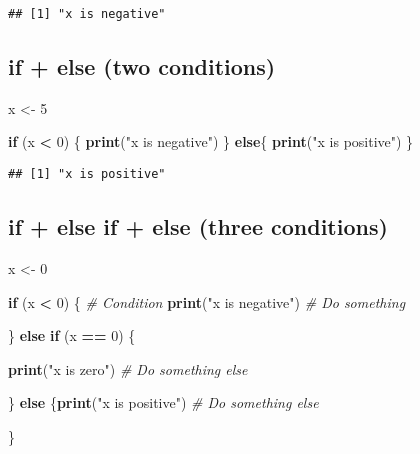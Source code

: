 \documentclass[
]{book}
\newenvironment{Shaded}{\begin{snugshade}}{\end{snugshade}}
\newcommand{\CommentTok}[1]{\textcolor[rgb]{0.56,0.35,0.01}{\textit{#1}}}
\newcommand{\ControlFlowTok}[1]{\textcolor[rgb]{0.13,0.29,0.53}{\textbf{#1}}}
\newcommand{\DecValTok}[1]{\textcolor[rgb]{0.00,0.00,0.81}{#1}}
\newcommand{\KeywordTok}[1]{\textcolor[rgb]{0.13,0.29,0.53}{\textbf{#1}}}
\newcommand{\NormalTok}[1]{#1}
\newcommand{\OperatorTok}[1]{\textcolor[rgb]{0.81,0.36,0.00}{\textbf{#1}}}
\newcommand{\StringTok}[1]{\textcolor[rgb]{0.31,0.60,0.02}{#1}}
\begin{document}
\begin{verbatim}
## [1] "x is negative"
\end{verbatim}

\hypertarget{if-else-two-conditions}{%
\subsection{if + else (two conditions)}\label{if-else-two-conditions}}

\begin{Shaded}
\begin{Highlighting}[]
\NormalTok{x \textless{}{-}}\StringTok{ }\DecValTok{5}

\ControlFlowTok{if}\NormalTok{ (x }\OperatorTok{\textless{}}\StringTok{ }\DecValTok{0}\NormalTok{) \{}
  \KeywordTok{print}\NormalTok{(}\StringTok{"x is negative"}\NormalTok{)}
\NormalTok{\} }\ControlFlowTok{else}\NormalTok{\{}
  \KeywordTok{print}\NormalTok{(}\StringTok{"x is positive"}\NormalTok{)}
\NormalTok{\}}
\end{Highlighting}
\end{Shaded}

\begin{verbatim}
## [1] "x is positive"
\end{verbatim}

\hypertarget{if-else-if-else-three-conditions}{%
\subsection{if + else if + else (three conditions)}\label{if-else-if-else-three-conditions}}

\begin{Shaded}
\begin{Highlighting}[]
\NormalTok{x \textless{}{-}}\StringTok{ }\DecValTok{0}

\ControlFlowTok{if}\NormalTok{ (x }\OperatorTok{\textless{}}\StringTok{ }\DecValTok{0}\NormalTok{) \{ }\CommentTok{\# Condition }
  \KeywordTok{print}\NormalTok{(}\StringTok{"x is negative"}\NormalTok{) }\CommentTok{\# Do something }

\NormalTok{  \} }\ControlFlowTok{else} \ControlFlowTok{if}\NormalTok{ (x }\OperatorTok{==}\StringTok{ }\DecValTok{0}\NormalTok{) \{ }
  
    \KeywordTok{print}\NormalTok{(}\StringTok{"x is zero"}\NormalTok{) }\CommentTok{\# Do something else }

\NormalTok{    \} }\ControlFlowTok{else}\NormalTok{ \{}\KeywordTok{print}\NormalTok{(}\StringTok{"x is positive"}\NormalTok{) }\CommentTok{\# Do something else }

\NormalTok{      \}}
\end{Highlighting}
\end{Shaded}
\end{document}
